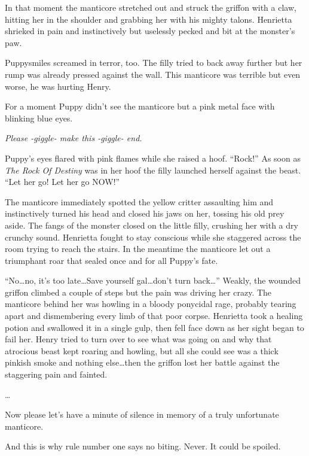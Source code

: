 In that moment the manticore stretched out and struck the griffon with a claw, hitting her in the shoulder and grabbing her with his mighty talons. Henrietta shrieked in pain and instinctively but uselessly pecked and bit at the monster's paw.

Puppysmiles screamed in terror, too. The filly tried to back away further but her rump was already pressed against the wall. This manticore was terrible but even worse, he was hurting Henry.

For a moment Puppy didn't see the manticore but a pink metal face with blinking blue eyes.

\emph{Please -giggle- make this -giggle- end.}

Puppy's eyes flared with pink flames while she raised a hoof. ``Rock!'' As soon as \emph{The Rock Of Destiny} was in her hoof the filly launched herself against the beast. ``Let her go! Let her go NOW!''

The manticore immediately spotted the yellow critter assaulting him and instinctively turned his head and closed his jaws on her, tossing his old prey aside. The fangs of the monster closed on the little filly, crushing her with a dry crunchy sound. Henrietta fought to stay conscious while she staggered across the room trying to reach the stairs. In the meantime the manticore let out a triumphant roar that sealed once and for all Puppy's fate.

``No\dots no, it's too late\dots Save yourself gal\dots don't turn back\dots'' Weakly, the wounded griffon climbed a couple of steps but the pain was driving her crazy. The manticore behind her was howling in a bloody ponycidal rage, probably tearing apart and dismembering every limb of that poor corpse. Henrietta took a healing potion and swallowed it in a single gulp, then fell face down as her sight began to fail her. Henry tried to turn over to see what was going on and why that atrocious beast kept roaring and howling, but all she could see was a thick pinkish smoke and nothing else\dots then the griffon lost her battle against the staggering pain and fainted.

\dots


Now please let's have a minute of silence in memory of a truly unfortunate manticore.

And this is why rule number one says no biting. Never. It could be spoiled.

\horizonline


